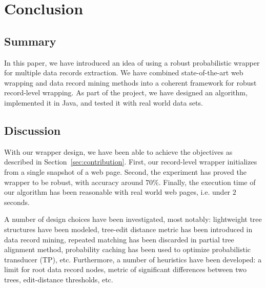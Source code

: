 \chapter{Conclusion}
\label{ch:conclusion}


\section{Summary}

In this paper, we have introduced an idea of using a robust probabilistic wrapper for multiple data records extraction. We have combined state-of-the-art web wrapping and data record mining methods into a coherent framework for robust record-level wrapping. As part of the project, we have designed an algorithm, implemented it in Java, and tested it with real world data sets.


\section{Discussion}

With our wrapper design, we have been able to achieve the objectives as described in Section~\ref{sec:contribution}. First, our record-level wrapper initializes from a single snapshot of a web page. Second, the experiment has proved the wrapper to be robust, with accuracy around $70\%$. Finally, the execution time of our algorithm has been reasonable with real world web pages, i.e. under $2$ seconds.

A number of design choices have been investigated, most notably: lightweight tree structures have been modeled, tree-edit distance metric has been introduced in data record mining, repeated matching has been discarded in partial tree alignment method, probability caching has been used to optimize probabilistic transducer (TP), etc.  Furthermore, a number of heuristics have been developed: a limit for root data record nodes, metric of significant differences between two trees, edit-distance thresholds, etc.

